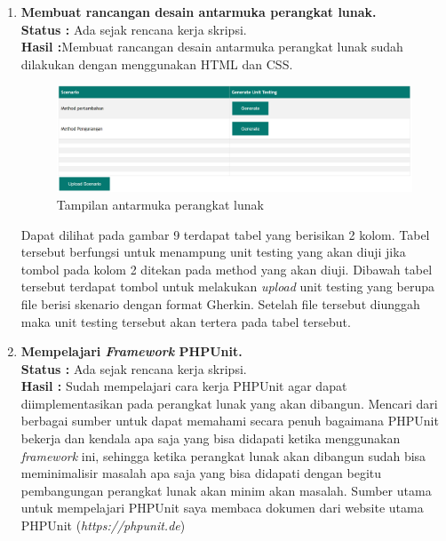 \documentclass[a4paper,twoside]{article}
\begin{document}
\begin{enumerate}
		\item \textbf{Membuat rancangan desain antarmuka perangkat lunak.}\\
		{\bf Status :} Ada sejak rencana kerja skripsi.\\
		{\bf Hasil :}Membuat rancangan desain antarmuka perangkat lunak sudah dilakukan dengan menggunakan HTML dan CSS.
		\begin{figure}[h!]
			\includegraphics[scale=0.45]{../DokumenSkripsi/gambar/uiFix}
			\centering
			\caption{Tampilan antarmuka perangkat lunak}
		\end{figure}
		Dapat dilihat pada gambar 9 terdapat tabel yang berisikan 2 kolom. Tabel tersebut berfungsi untuk menampung unit testing yang akan diuji jika tombol pada kolom 2 ditekan pada method yang akan diuji. Dibawah tabel tersebut terdapat tombol untuk melakukan \textit{upload} unit testing yang berupa file berisi skenario dengan format Gherkin. Setelah file tersebut diunggah maka unit testing tersebut akan tertera pada tabel tersebut.
		
		\item \textbf{Mempelajari \textit{Framework} PHPUnit.}\\
		\textbf{Status :} Ada sejak rencana kerja skripsi.\\
		\textbf{Hasil : } Sudah mempelajari cara kerja PHPUnit agar dapat diimplementasikan pada perangkat lunak yang akan dibangun. Mencari dari berbagai sumber untuk dapat memahami secara penuh bagaimana PHPUnit bekerja dan kendala apa saja yang bisa didapati ketika menggunakan \textit{framework} ini, sehingga ketika perangkat lunak akan dibangun sudah bisa meminimalisir masalah apa saja yang bisa didapati dengan begitu pembangungan perangkat lunak akan minim akan masalah. Sumber utama untuk mempelajari PHPUnit saya membaca dokumen dari website utama PHPUnit (\textit{https://phpunit.de})
		

\end{enumerate}
\end{document}
